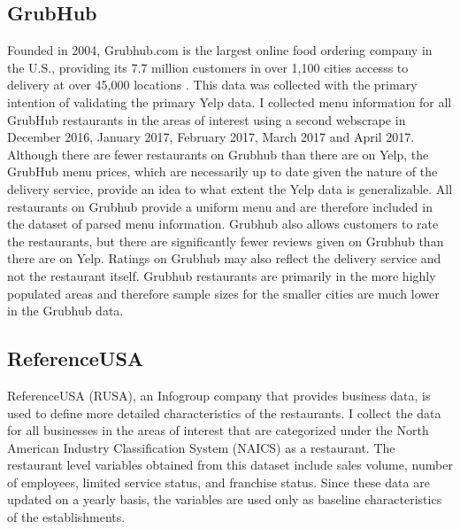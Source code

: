 \documentclass[11pt]{article}
\begin{document}
\subsection{GrubHub} 

Founded in 2004, Grubhub.com is the largest online food ordering company in the U.S., providing its 7.7 million customers in over 1,100 cities accesss to delivery at over 45,000 locations \cite{grubstat}. This data was collected with the primary intention of validating the primary Yelp data. I collected menu information for all GrubHub restaurants in the areas of interest using a second webscrape in December 2016, January 2017, February 2017, March 2017 and April 2017. Although there are fewer restaurants on Grubhub than there are on Yelp, the GrubHub menu prices, which are necessarily up to date given the nature of the delivery service, provide an idea to what extent the Yelp data is generalizable. All restaurants on Grubhub provide a uniform menu and are therefore included in the dataset of parsed menu information. Grubhub also allows customers to rate the restaurants, but there are significantly fewer reviews given on Grubhub than there are on Yelp. Ratings on Grubhub may also reflect the delivery service and not the restaurant itself. Grubhub restaurants are primarily in the more highly populated areas and therefore sample sizes for the smaller cities are much lower in the Grubhub data.


\subsection{ReferenceUSA}

ReferenceUSA (RUSA), an Infogroup company that provides business data, is used to define more detailed characteristics of the restaurants. I collect the data for all businesses in the areas of interest that are categorized under the North American Industry Classification System (NAICS) as a restaurant. The restaurant level variables obtained from this dataset include sales volume, number of employees, limited service status, and franchise status. Since these data are updated on a yearly basis, the variables are used only as baseline characteristics of the establishments. 



\end{document}
